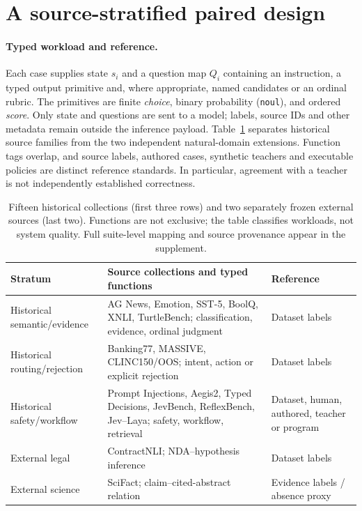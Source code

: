 \section{A source-stratified paired design}
\label{sec:design}
\paragraph{Typed workload and reference.}
Each case supplies state $s_i$ and a question map $Q_i$ containing an instruction, a typed output primitive and, where appropriate, named candidates or an ordinal rubric. The primitives are finite \emph{choice}, binary probability (\texttt{noul}), and ordered \emph{score}. Only state and questions are sent to a model; labels, source IDs and other metadata remain outside the inference payload. Table~\ref{tab:taxonomy} separates historical source families from the two independent natural-domain extensions. Function tags overlap, and source labels, authored cases, synthetic teachers and executable policies are distinct reference standards. In particular, agreement with a teacher is not independently established correctness.

\begin{table}[H]
\centering\scriptsize
\begin{tabular}{@{}p{.21\linewidth}p{.54\linewidth}p{.18\linewidth}@{}}
\toprule
Stratum & Source collections and typed functions & Reference \\
\midrule
Historical semantic/evidence & AG News, Emotion, SST-5, BoolQ, XNLI, TurtleBench; classification, evidence, ordinal judgment & Dataset labels \\
Historical routing/rejection & Banking77, MASSIVE, CLINC150/OOS; intent, action or explicit rejection & Dataset labels \\
Historical safety/workflow & Prompt Injections, Aegis2, Typed Decisions, JevBench, ReflexBench, Jev--Laya; safety, workflow, retrieval & Dataset, human, authored, teacher or program \\
External legal & ContractNLI; NDA--hypothesis inference & Dataset labels \\
External science & SciFact; claim--cited-abstract relation & Evidence labels / absence proxy \\
\bottomrule
\end{tabular}
\caption{Fifteen historical collections (first three rows) and two separately frozen external sources (last two). Functions are not exclusive; the table classifies workloads, not system quality. Full suite-level mapping and source provenance appear in the supplement.}
\label{tab:taxonomy}
\end{table}

